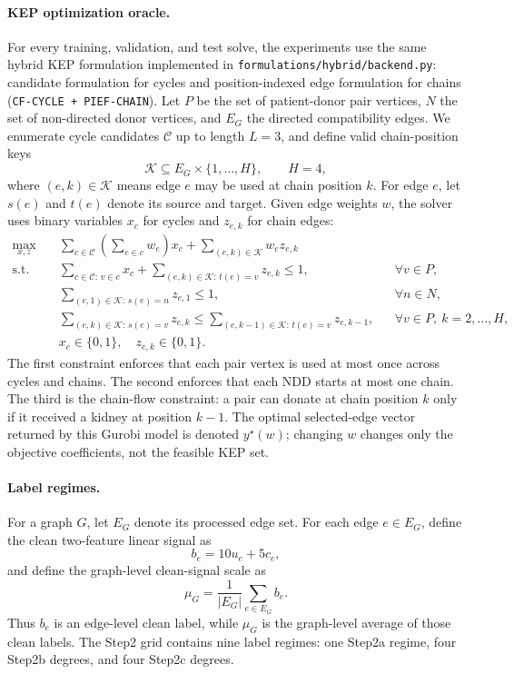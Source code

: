 \documentclass[11pt]{article}
\begin{document}
\paragraph{KEP optimization oracle.}
For every training, validation, and test solve, the experiments use the same hybrid KEP formulation implemented in \texttt{formulations/hybrid/backend.py}: candidate formulation for cycles and position-indexed edge formulation for chains (\texttt{CF-CYCLE + PIEF-CHAIN}). Let \(P\) be the set of patient-donor pair vertices, \(N\) the set of non-directed donor vertices, and \(E_G\) the directed compatibility edges. We enumerate cycle candidates \(\mathcal C\) up to length \(L=3\), and define valid chain-position keys
\[
  \mathcal K \subseteq E_G\times\{1,\ldots,H\},\qquad H=4,
\]
where \((e,k)\in\mathcal K\) means edge \(e\) may be used at chain position \(k\). For edge \(e\), let \(s(e)\) and \(t(e)\) denote its source and target. Given edge weights \(w\), the solver uses binary variables \(x_c\) for cycles and \(z_{e,k}\) for chain edges:
\[
\begin{aligned}
\max_{x,z}\quad
& \sum_{c\in\mathcal C}\left(\sum_{e\in c} w_e\right)x_c
  + \sum_{(e,k)\in\mathcal K} w_e z_{e,k} \\
\text{s.t.}\quad
& \sum_{c\in\mathcal C:\, v\in c} x_c
  + \sum_{(e,k)\in\mathcal K:\, t(e)=v} z_{e,k}
  \le 1,
  && \forall v\in P,\\
& \sum_{(e,1)\in\mathcal K:\, s(e)=n} z_{e,1}
  \le 1,
  && \forall n\in N,\\
& \sum_{(e,k)\in\mathcal K:\, s(e)=v} z_{e,k}
  \le
  \sum_{(e,k-1)\in\mathcal K:\, t(e)=v} z_{e,k-1},
  && \forall v\in P,\ k=2,\ldots,H,\\
& x_c\in\{0,1\},\quad z_{e,k}\in\{0,1\}.
\end{aligned}
\]
The first constraint enforces that each pair vertex is used at most once across cycles and chains. The second enforces that each NDD starts at most one chain. The third is the chain-flow constraint: a pair can donate at chain position \(k\) only if it received a kidney at position \(k-1\). The optimal selected-edge vector returned by this Gurobi model is denoted \(y^\star(w)\); changing \(w\) changes only the objective coefficients, not the feasible KEP set.

\paragraph{Label regimes.}
For a graph \(G\), let \(E_G\) denote its processed edge set. For each edge \(e\in E_G\), define the clean two-feature linear signal as
\[
  b_e = 10u_e + 5c_e,
\]
and define the graph-level clean-signal scale as
\[
  \mu_G = \frac{1}{|E_G|}\sum_{e\in E_G} b_e.
\]
Thus \(b_e\) is an edge-level clean label, while \(\mu_G\) is the graph-level average of those clean labels. The Step2 grid contains nine label regimes: one Step2a regime, four Step2b degrees, and four Step2c degrees.
\end{document}
